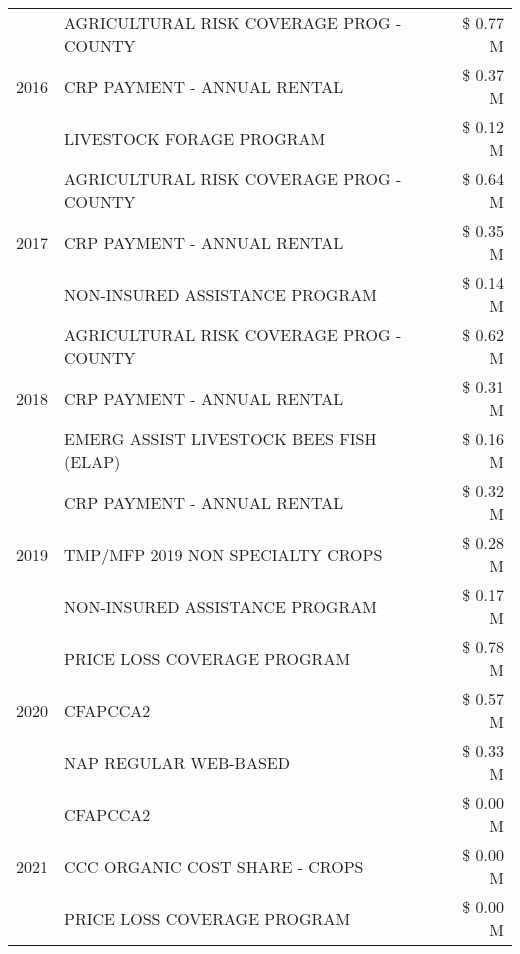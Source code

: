 \begin{tabular}{llr}
\multirow[t]{3}{*}{2016} & AGRICULTURAL RISK COVERAGE PROG - COUNTY      & \$ 0.77 M \\
 & CRP PAYMENT - ANNUAL RENTAL                   & \$ 0.37 M \\
 & LIVESTOCK FORAGE PROGRAM                      & \$ 0.12 M \\
\cline{1-3}
\multirow[t]{3}{*}{2017} & AGRICULTURAL RISK COVERAGE PROG - COUNTY & \$ 0.64 M \\
 & CRP PAYMENT - ANNUAL RENTAL & \$ 0.35 M \\
 & NON-INSURED ASSISTANCE PROGRAM & \$ 0.14 M \\
\cline{1-3}
\multirow[t]{3}{*}{2018} & AGRICULTURAL RISK COVERAGE PROG - COUNTY & \$ 0.62 M \\
 & CRP PAYMENT - ANNUAL RENTAL & \$ 0.31 M \\
 & EMERG ASSIST LIVESTOCK BEES FISH (ELAP) & \$ 0.16 M \\
\cline{1-3}
\multirow[t]{3}{*}{2019} & CRP PAYMENT - ANNUAL RENTAL & \$ 0.32 M \\
 & TMP/MFP 2019 NON SPECIALTY CROPS & \$ 0.28 M \\
 & NON-INSURED ASSISTANCE PROGRAM & \$ 0.17 M \\
\cline{1-3}
\multirow[t]{3}{*}{2020} & PRICE LOSS COVERAGE PROGRAM & \$ 0.78 M \\
 & CFAPCCA2 & \$ 0.57 M \\
 & NAP REGULAR WEB-BASED & \$ 0.33 M \\
\cline{1-3}
\multirow[t]{3}{*}{2021} & CFAPCCA2 & \$ 0.00 M \\
 & CCC ORGANIC COST SHARE - CROPS & \$ 0.00 M \\
 & PRICE LOSS COVERAGE PROGRAM & \$ 0.00 M \\
\cline{1-3}
\bottomrule
\end{tabular}
